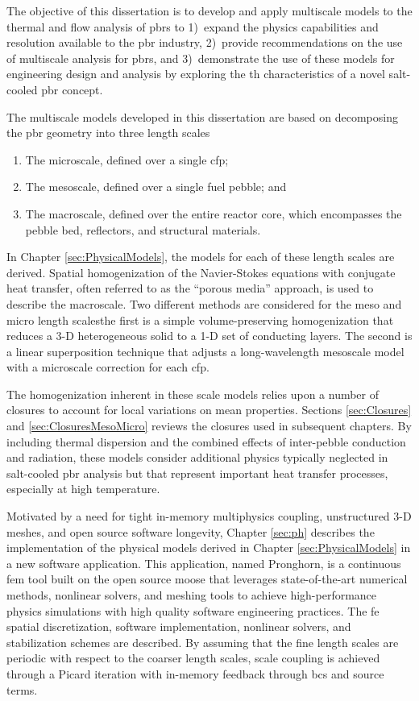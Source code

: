 The objective of this dissertation is to develop and apply multiscale models to the thermal and flow analysis of \glspl{pbr} to 1)~expand the physics capabilities and resolution available to the \gls{pbr} industry, 2)~provide recommendations on the use of multiscale analysis for \glspl{pbr}, and 3)~demonstrate the use of these models for engineering design and analysis by exploring the \gls{th} characteristics of a novel salt-cooled \gls{pbr} concept.

The multiscale models developed in this dissertation are based on decomposing the \gls{pbr} geometry into three length scales\mdash

\begin{enumerate}
\item The microscale, defined over a single \gls{cfp};
\item The mesoscale, defined over a single fuel pebble; and
\item The macroscale, defined over the entire reactor core, which encompasses the pebble bed, reflectors, and structural materials.
\end{enumerate}

In Chapter \ref{sec:PhysicalModels}, the models for each of these length scales are derived. Spatial homogenization of the Navier-Stokes equations with conjugate heat transfer, often referred to as the ``porous media'' approach, is used to describe the macroscale. Two different methods are considered for the meso and micro length scales\mdash the first is a simple volume-preserving homogenization that reduces a 3-D heterogeneous solid to a 1-D set of conducting layers. The second is a linear superposition technique that adjusts a long-wavelength mesoscale model with a microscale correction for each \gls{cfp}. 

The homogenization inherent in these scale models relies upon a number of closures to account for local variations on mean properties. Sections \ref{sec:Closures} and \ref{sec:ClosuresMesoMicro} reviews the closures used in subsequent chapters. By including thermal dispersion and the combined effects of inter-pebble conduction and radiation, these models consider additional physics typically neglected in salt-cooled \gls{pbr} analysis \cite{xin_wang_thesis,scarlat} but that represent important heat transfer processes, especially at high temperature. 

Motivated by a need for tight in-memory multiphysics coupling, unstructured 3-D meshes, and open source software longevity, Chapter \ref{sec:ph} describes the implementation of the physical models derived in Chapter \ref{sec:PhysicalModels} in a new software application. This application, named Pronghorn, is a continuous \gls{fem} tool built on the open source \gls{moose} that leverages state-of-the-art numerical methods, nonlinear solvers, and meshing tools to achieve high-performance physics simulations with high quality software engineering practices. The \gls{fe} spatial discretization, software implementation, nonlinear solvers, and stabilization schemes are described. By assuming that the fine length scales are periodic with respect to the coarser length scales, scale coupling is achieved through a Picard iteration with in-memory feedback through \glspl{bc} and source terms. 


